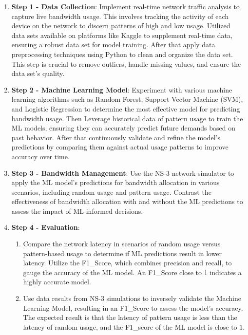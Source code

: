 \documentclass[10pt]{article}
\begin{document}
\begin{enumerate}
  \item \textbf{Step 1 - Data Collection}: Implement real-time network traffic analysis to capture live bandwidth usage. This involves tracking the activity of each device on the network to discern patterns of high and low usage. Utilized data sets available on platforms like Kaggle \cite{navabhaarathi2023network} to supplement real-time data, ensuring a robust data set for model training. After that apply data preprocessing techniques using Python to clean and organize the data set. This step is crucial to remove outliers, handle missing values, and ensure the data set's quality.
  \item \textbf{Step 2 - Machine Learning Model}:  Experiment with various machine learning algorithms such as Random Forest, Support Vector Machine (SVM), and Logistic Regression to determine the most effective model for predicting bandwidth usage. Then Leverage historical data of pattern usage to train the ML models, ensuring they can accurately predict future demands based on past behavior. After that continuously validate and refine the model's predictions by comparing them against actual usage patterns to improve accuracy over time.
  \item \textbf{Step 3 - Bandwidth Management}: Use the NS-3 network simulator to apply the ML model's predictions for bandwidth allocation in various scenarios, including random usage and pattern usage. Contrast the effectiveness of bandwidth allocation with and without the ML predictions to assess the impact of ML-informed decisions.
  \item \textbf{Step 4 - Evaluation}: 
  \begin{enumerate}
    \item Compare the network latency in scenarios of random usage versus pattern-based usage to determine if ML predictions result in lower latency. Utilize the F1\_Score, which combines precision and recall, to gauge the accuracy of the ML model. An F1\_Score close to 1 indicates a highly accurate model.
    \item Use data results from NS-3 simulations to inversely validate the Machine Learning Model, resulting in an F1\_Score to assess the model's accuracy. The expected result is that the latency of pattern usage is less than the latency of random usage, and the F1\_score of the ML model is close to 1.
  \end{enumerate}
\end{enumerate}
\end{document}
